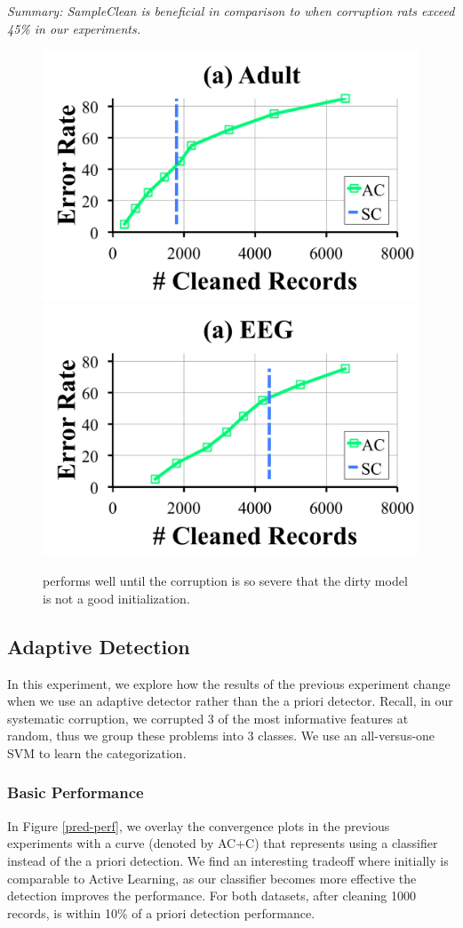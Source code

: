 \noindent \emph{Summary: SampleClean is beneficial in comparison to \sys when corruption rats exceed 45\% in our experiments.}

\begin{figure}[ht!]
\centering
 \includegraphics[width=0.49\columnwidth]{exp/exp9a.pdf}
  \includegraphics[width=0.49\columnwidth]{exp/exp9b.pdf}
 \caption{\sys performs well until the corruption is so severe that the dirty model is not a good initialization.  \label{bias}}
\end{figure}

\subsection{Adaptive Detection}
In this experiment, we explore how the results of the previous experiment change when we use an adaptive detector rather than the a priori detector.
Recall, in our systematic corruption, we corrupted 3 of the most informative features at random, thus we group these problems into 3 classes.
We use an all-versus-one SVM to learn the categorization.

\subsubsection{Basic Performance}
In Figure \ref{pred-perf}, we overlay the convergence plots in the previous experiments with a curve (denoted by AC+C) that represents \sys using a classifier instead of the a priori detection.
We find an interesting tradeoff where initially \sys is comparable to Active Learning, as our classifier becomes more effective the detection improves the performance.
For both datasets, after cleaning 1000 records, \sys is within 10\% of a priori detection performance.

